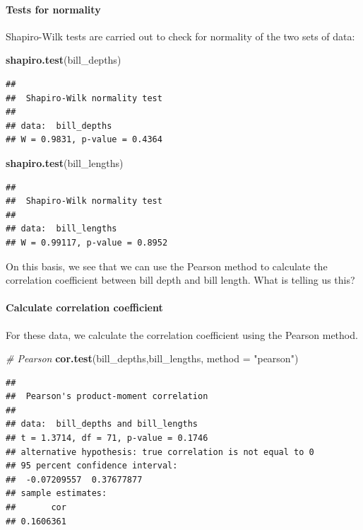 \documentclass[
]{article}
\newenvironment{Shaded}{\begin{snugshade}}{\end{snugshade}}
\newcommand{\AttributeTok}[1]{\textcolor[rgb]{0.13,0.29,0.53}{#1}}
\newcommand{\CommentTok}[1]{\textcolor[rgb]{0.56,0.35,0.01}{\textit{#1}}}
\newcommand{\FunctionTok}[1]{\textcolor[rgb]{0.13,0.29,0.53}{\textbf{#1}}}
\newcommand{\NormalTok}[1]{#1}
\newcommand{\StringTok}[1]{\textcolor[rgb]{0.31,0.60,0.02}{#1}}
\begin{document}
\paragraph{Tests for normality}\label{tests-for-normality}

Shapiro-Wilk tests are carried out to check for normality of the two
sets of data:

\begin{Shaded}
\begin{Highlighting}[]
\FunctionTok{shapiro.test}\NormalTok{(bill\_depths)}
\end{Highlighting}
\end{Shaded}

\begin{verbatim}
## 
##  Shapiro-Wilk normality test
## 
## data:  bill_depths
## W = 0.9831, p-value = 0.4364
\end{verbatim}

\begin{Shaded}
\begin{Highlighting}[]
\FunctionTok{shapiro.test}\NormalTok{(bill\_lengths)}
\end{Highlighting}
\end{Shaded}

\begin{verbatim}
## 
##  Shapiro-Wilk normality test
## 
## data:  bill_lengths
## W = 0.99117, p-value = 0.8952
\end{verbatim}

On this basis, we see that we can use the Pearson method to calculate
the correlation coefficient between bill depth and bill length. What is
telling us this?

\paragraph{Calculate correlation
coefficient}\label{calculate-correlation-coefficient}

For these data, we calculate the correlation coefficient using the
Pearson method.

\begin{Shaded}
\begin{Highlighting}[]
\CommentTok{\# Pearson}
\FunctionTok{cor.test}\NormalTok{(bill\_depths,bill\_lengths, }\AttributeTok{method =} \StringTok{"pearson"}\NormalTok{)}
\end{Highlighting}
\end{Shaded}

\begin{verbatim}
## 
##  Pearson's product-moment correlation
## 
## data:  bill_depths and bill_lengths
## t = 1.3714, df = 71, p-value = 0.1746
## alternative hypothesis: true correlation is not equal to 0
## 95 percent confidence interval:
##  -0.07209557  0.37677877
## sample estimates:
##       cor 
## 0.1606361
\end{verbatim}
\end{document}

